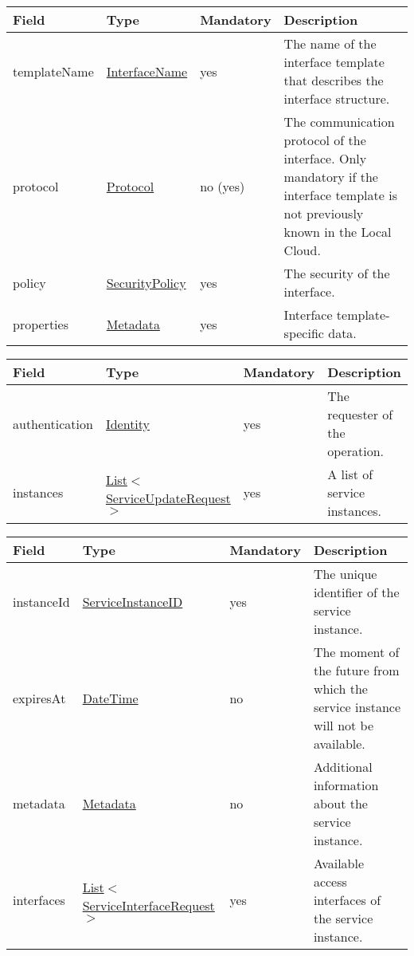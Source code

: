 \documentclass[a4paper]{arrowhead}
\newcommand{\pref}[1]{{\textcolor{ArrowheadGrey}{\hyperref[sec:model:primitives:#1]{#1}}}}
\begin{document}
\begin{table}[ht!]
\begin{tabularx}{\textwidth}{| p{2.5cm} | p{3cm} | p{2cm} | X |} \hline
\rowcolor{gray!33} Field & Type & Mandatory & Description \\ \hline
templateName & \pref{InterfaceName} & yes & The name of the interface template that describes the interface structure. \\ \hline
protocol & \pref{Protocol} & no (yes) & The communication protocol of the interface. Only mandatory if the interface template is not previously known in the Local Cloud.  \\ \hline
policy & \pref{SecurityPolicy} & yes & The security of the interface. \\ \hline
properties &\hyperref[sec:model:Metadata]{Metadata} & yes & Interface template-specific data. \\ \hline
\end{tabularx}
\end{table}

 
\begin{table}[ht!]
\begin{tabularx}{\textwidth}{| p{2.5cm} | p{4.7cm} | p{2cm} | X |} \hline
\rowcolor{gray!33} Field & Type & Mandatory & Description \\ \hline
authentication & \hyperref[sec:model:Identity]{Identity} & yes & The requester of the operation. \\ \hline
instances & \pref{List}$<$\hyperref[sec:model:ServiceUpdateRequest]{ServiceUpdateRequest}$>$ & yes & A list of service instances. \\ \hline
\end{tabularx}
\end{table}

 
\begin{table}[ht!]
\begin{tabularx}{\textwidth}{| p{2.5cm} | p{4.9cm} | p{2cm} | X |} \hline
\rowcolor{gray!33} Field & Type & Mandatory & Description \\ \hline
instanceId & \pref{ServiceInstanceID} & yes & The unique identifier of the service instance. \\ \hline
expiresAt & \pref{DateTime} & no & The moment of the future from which the service instance will not be available. \\ \hline
metadata &\hyperref[sec:model:Metadata]{Metadata} & no & Additional information about the service ins\-tance. \\ \hline
interfaces &  \pref{List}$<$\hyperref[sec:model:ServiceInterfaceRequest]{ServiceInterfaceRequest}$>$ & yes & Available access interfaces of the service ins\-tance.  \\ \hline
\end{tabularx}
\end{table}
\end{document}
